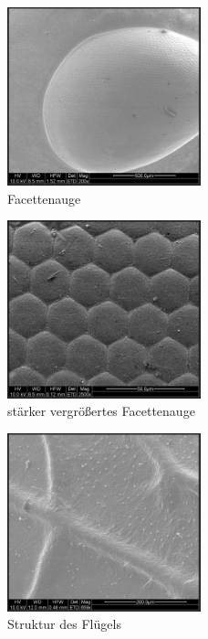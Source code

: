 \documentclass[12pt,english,ngerman]{scrartcl}
\begin{document}
\begin{figure}[H]
	\begin{center}
		\includegraphics[width =0.5\textwidth]{./figures/auge.png}
	\end{center}
	\caption{Facettenauge}
    \label{fig:auge}
\end{figure}

\begin{figure}[H]
	\begin{center}
		\includegraphics[width =0.5\textwidth]{./figures/auge2.png}
	\end{center}
	\caption{stärker vergrößertes Facettenauge}
    \label{fig:auge2}
\end{figure}

\begin{figure}[H]
	\begin{center}
		\includegraphics[width =0.5\textwidth]{./figures/flugel.png}
	\end{center}
	\caption{Struktur des Flügels}
    \label{fig:flugel}
\end{figure}
\end{document}
